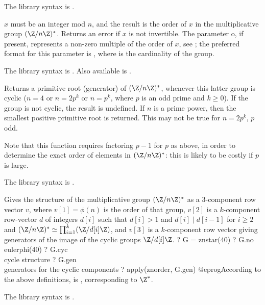 The library syntax is .

\label{se:znorder}
$x$ must be an integer mod $n$, and the
result is the order of $x$ in the multiplicative group $(\Z/n\Z)^*$. Returns
an error if $x$ is not invertible.
The parameter o, if present, represents a non-zero
multiple of the order of $x$, see ; the preferred format for
this parameter is , where 
is the cardinality of the group.

The library syntax is .
Also available is .

\label{se:znprimroot}
Returns a primitive root (generator) of $(\Z/n\Z)^*$, whenever this
latter group is cyclic ($n = 4$ or $n = 2p^k$ or $n = p^k$, where $p$ is an
odd prime and $k \geq 0$). If the group is not cyclic, the result is
undefined. If $n$ is a prime power, then the smallest positive primitive
root is returned. This may not be true for $n = 2p^k$, $p$ odd.

Note that this function requires factoring $p-1$ for $p$ as above,
in order to determine the exact order of elements in
$(\Z/n\Z)^*$: this is likely to be costly if $p$ is large.

The library syntax is .

\label{se:znstar}
Gives the structure of the multiplicative group
$(\Z/n\Z)^*$ as a 3-component row vector $v$, where $v[1]=\phi(n)$ is the
order of that group, $v[2]$ is a $k$-component row-vector $d$ of integers
$d[i]$ such that $d[i]>1$ and $d[i]\mid d[i-1]$ for $i \ge 2$ and
$(\Z/n\Z)^* \simeq \prod_{i=1}^k(\Z/d[i]\Z)$, and $v[3]$ is a $k$-component row
vector giving generators of the image of the cyclic groups $\Z/d[i]\Z$.
\bprog
? G = znstar(40)
? G.no   \\ eulerphi(40)
? G.cyc  \\ cycle structure
? G.gen  \\ generators for the cyclic components
? apply(znorder, G.gen)
@eprog\noindent According to the above definitions,  is
\kbd{[2, [2], [-1]]}, corresponding to $\Z^*$.

The library syntax is .


